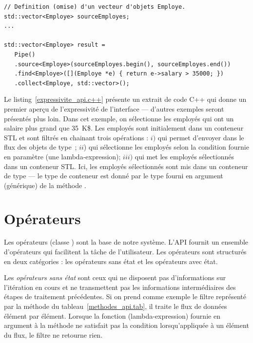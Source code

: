 
\begin{Listing}
{\small
\begin{lstlisting}
// Definition (omise) d'un vecteur d'objets Employe.
std::vector<Employe> sourceEmployes;
...

std::vector<Employe> result = 
   Pipe()
   .source<Employe>(sourceEmployes.begin(), sourceEmployes.end())
   .find<Employe>([](Employe *e) { return e->salary > 35000; })
   .collect<Employe, std::vector>();
\end{lstlisting}
}
\caption{Un exemple illustrant les principaux \'el\'ements de l'API de \ppff.}
\label{expressivite_api.c++}
\end{Listing}


Le listing~\ref{expressivite_api.c++} pr\'esente un extrait de code C++ qui donne un premier aper\c{c}u de l'expressivit\'e de l'interface --- d'autres exemples seront pr\'esent\'es plus loin. Dans cet exemple, on s\'electionne les employ\'es qui ont un salaire plus grand que 35~K\$. Les employ\'es sont initialement dans un conteneur STL et sont filtr\'es en chainant trois op\'erations : $i)$  qui permet d'envoyer dans le flux des objets de type~; $ii$)  qui s\'electionne les employ\'es selon la condition fournie en param\`etre (une lambda-expression); $iii)$  qui met les employ\'es s\'electionn\'es dans un conteneur STL. Ici, les employ\'es s\'electionn\'es sont mis dans un conteneur de type  --- le type de conteneur est donn\'e par le type fourni en argument (g\'en\'erique) de la m\'ethode .




\section{Op\'erateurs}

Les op\'erateurs (classe ) sont la base de notre syst\`eme. L'API fournit un ensemble d'op\'erateurs qui facilitent la t\^ache de l'utilisateur. Les op\'erateurs sont structur\'es en deux cat\'egories : les op\'erateurs sans \'etat et les op\'erateurs avec \'etat.

Les \emph{op\'erateurs sans \'etat} sont ceux qui ne disposent pas d'informations sur l'it\'eration en cours et ne transmettent pas les informations interm\'ediaires des \'etapes de traitement pr\'ec\'edentes. Si on prend comme exemple le filtre repr\'esent\'e par la m\'ethode  du tableau~\ref{methodes_api.tab}, il traite le flux de donn\'ees \'el\'ement par \'el\'ement. 
%
Lorsque la fonction (lambda-expression) fournie en argument \`a la m\'ethode  ne satisfait pas la condition lorsqu'appliqu\'ee \`a un \'el\'ement du flux, le filtre ne retourne rien. 

